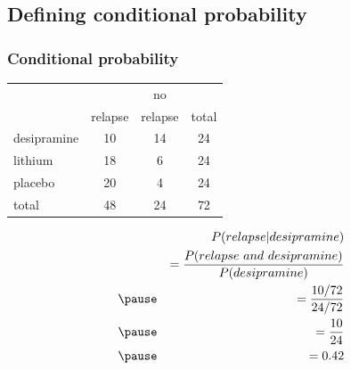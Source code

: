 \documentclass[slidestop,compress,mathserif]{beamer}
\begin{document}

\subsection{Defining conditional probability}


\begin{frame}
\frametitle{Conditional probability}


\pause

{
{\small
\begin{center}
\begin{tabular}{l | c c | c}
			& 		& no 		&  \\
			& relapse	& relapse	& total \\
\hline
desipramine	& 10		& 14		& 24 \\
lithium		& 18		& 6		& 24 \\
placebo		& 20		& 4		& 24  \\
\hline
total			& 48		& 24		&  72
\end{tabular}
\end{center}
}
}
{
\begin{eqnarray*}
&&P(relapse |  desipramine) \\
&&= \frac{P(relapse ~ and ~ desipramine)}{P(desipramine)} \\
\pause
&&= \frac{10 / 72}{24 / 72} \\
\pause
&&= \frac{10}{24} \\
\pause
&&= 0.42
\end{eqnarray*}
}

\end{frame}

\end{document}
